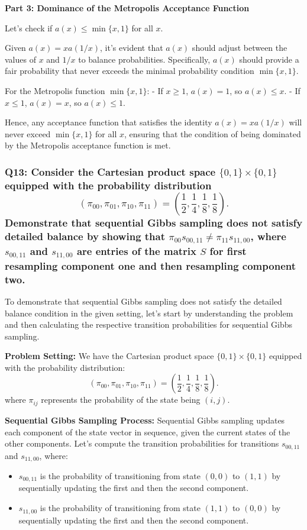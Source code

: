 \documentclass[8pt]{article}
\begin{document}
\textbf{Part 3: Dominance of the Metropolis Acceptance Function}

Let's check if \(a(x) \leq \min\{x, 1\}\) for all \(x\).

Given \(a(x) = x a(1/x)\), it's evident that \(a(x)\) should adjust between the values of \(x\) and \(1/x\) to balance probabilities. Specifically, \(a(x)\) should provide a fair probability that never exceeds the minimal probability condition \( \min\{x, 1\} \).

For the Metropolis function \( \min\{x, 1\} \):
- If \( x \geq 1 \), \( a(x) = 1 \), so \( a(x) \leq x \).
- If \( x \leq 1 \), \( a(x) = x \), so \( a(x) \leq 1 \).

Hence, any acceptance function that satisfies the identity \( a(x) = x a(1/x) \) will never exceed \( \min\{x, 1\} \) for all \(x\), ensuring that the condition of being dominated by the Metropolis acceptance function is met.

\subsubsection*{Q13:
Consider the Cartesian product space \(\{0, 1\} \times \{0, 1\}\) equipped with the probability distribution
\[
(\pi_{00}, \pi_{01}, \pi_{10}, \pi_{11}) = \left( \frac{1}{2}, \frac{1}{4}, \frac{1}{8}, \frac{1}{8} \right).
\]
Demonstrate that sequential Gibbs sampling does not satisfy detailed balance by showing that \(\pi_{00} s_{00, 11} \neq \pi_{11} s_{11, 00}\), where \(s_{00, 11}\) and \(s_{11, 00}\) are entries of the matrix \(S\) for first resampling component one and then resampling component two.}

To demonstrate that sequential Gibbs sampling does not satisfy the detailed balance condition in the given setting, let's start by understanding the problem and then calculating the respective transition probabilities for sequential Gibbs sampling.

\textbf{Problem Setting:}
We have the Cartesian product space \(\{0, 1\} \times \{0, 1\}\) equipped with the probability distribution:
\[
(\pi_{00}, \pi_{01}, \pi_{10}, \pi_{11}) = \left( \frac{1}{2}, \frac{1}{4}, \frac{1}{8}, \frac{1}{8} \right).
\]
where \(\pi_{ij}\) represents the probability of the state being \((i, j)\).

\textbf{Sequential Gibbs Sampling Process:}
Sequential Gibbs sampling updates each component of the state vector in sequence, given the current states of the other components. Let's compute the transition probabilities for transitions \(s_{00, 11}\) and \(s_{11, 00}\), where:
\begin{itemize}
    \item \(s_{00, 11}\) is the probability of transitioning from state \((0, 0)\) to \((1, 1)\) by sequentially updating the first and then the second component.
    \item \(s_{11, 00}\) is the probability of transitioning from state \((1, 1)\) to \((0, 0)\) by sequentially updating the first and then the second component.
\end{itemize}
\end{document}
